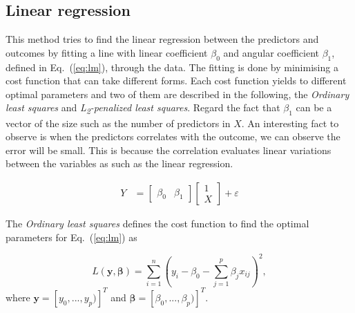 \documentclass[conference]{IEEEtran}
\begin{document}
\subsection{Linear regression}

This method tries to find the linear regression between the predictors and outcomes by fitting a line with linear coefficient $\beta_0$ and angular coefficient $\beta_1$, defined in Eq.~(\ref{eq:lm}), through the data. The fitting is done by minimising a cost function that can take different forms. Each cost function yields to different optimal parameters and two of them are described in the following, the \emph{Ordinary least squares} and \emph{L\textsubscript{2}-penalized least squares}. Regard the fact that $\beta_1$ can be a vector of the size such as the number of predictors in $X$. An interesting fact to observe is when the predictors correlates with the outcome, we can observe the error will be small. This is because the correlation evaluates linear variations between the variables as such as the linear regression.

\begin{align} \label{eq:lm}   
  Y &= \begin{bmatrix} 
        \beta_0 & \beta_1 
       \end{bmatrix} 
       \begin{bmatrix} 
        1 \\ X 
      \end{bmatrix} + \varepsilon
\end{align} 

The \emph{Ordinary least squares} defines the cost function to find the optimal parameters for Eq.~(\ref{eq:lm}) as

\begin{equation}\label{eq:cf_ols}
  L(\mathbf{y}, \boldsymbol{\beta}) =\sum_{i=1}^{n}\left(y_{i}-\beta_{0}-\sum_{j=1}^{p} \beta_{j} x_{i j}\right)^{2},
\end{equation}
%
where $\mathbf{y} = [y_0, ..., y_p)]^T$ and $\boldsymbol{\beta} = [\beta_0, ..., \beta_p)]^T$.
\end{document}
